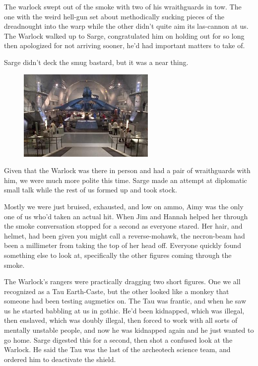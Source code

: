 The warlock swept out of the smoke with two of his wraithguards in tow. 
The one with the weird hell-gun set about methodically sucking pieces of the dreadnought into the warp while the other didn't quite aim its las-cannon at us. 
The Warlock walked up to Sarge, congratulated him on holding out for so long then apologized for not arriving sooner, he'd had important matters to take of.

Sarge didn't deck the smug bastard, but it was a near thing.

\begin{figure}
	\begin{center}
		\includegraphics[width=\figwidth]{pics/11/81.png}
	\end{center}
\end{figure}
Given that the Warlock was there in person and had a pair of wraithguards with him, we were much more polite this time. 
Sarge made an attempt at diplomatic small talk while the rest of us formed up and took stock.

Mostly we were just bruised, exhausted, and low on ammo, Aimy was the only one of us who'd taken an actual hit. 
When Jim and Hannah helped her through the smoke conversation stopped for a second as everyone stared. 
Her hair, and helmet, had been given you might call a reverse-mohawk, the necron-beam had been a millimeter from taking the top of her head off. 
Everyone quickly found something else to look at, specifically the other figures coming through the smoke.

The Warlock's rangers were practically dragging two short figures. 
One we all recognized as a Tau Earth-Caste, but the other looked like a monkey that someone had been testing augmetics on. 
The Tau was frantic, and when he saw us he started babbling at us in gothic. 
He'd been kidnapped, which was illegal, then enslaved, which was doubly illegal, then forced to work with all sorts of mentally unstable people, and now he was kidnapped again and he just wanted to go home. 
Sarge digested this for a second, then shot a confused look at the Warlock. 
He said the Tau was the last of the archeotech science team, and ordered him to deactivate the shield.

